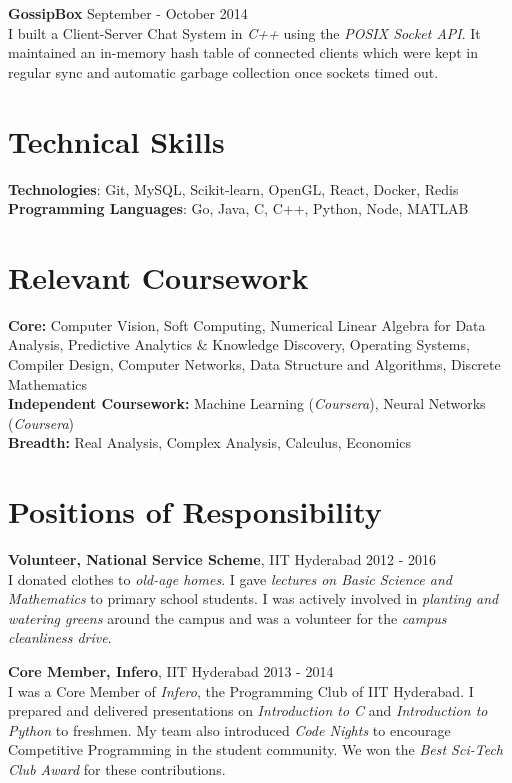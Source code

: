 \documentclass[margin,line]{res}
\begin{document}
\begin{resume}
  \vspace*{-2.5mm}

  {\bf GossipBox} \hfill September - October 2014 \\
    I built a Client-Server Chat System in {\it C++} using the {\it POSIX Socket API}. It maintained an in-memory hash table of connected clients which were kept in regular sync and automatic garbage collection once sockets timed out.

\section{\sc Technical Skills}

  {\bf Technologies}: Git, MySQL, Scikit-learn, OpenGL, React, Docker, Redis \\
  {\bf Programming Languages}: Go, Java, C, C++, Python, Node, MATLAB

\section{\sc Relevant Coursework}

  {\bf Core:} Computer Vision, Soft Computing, Numerical Linear Algebra for Data Analysis, Predictive Analytics \& Knowledge Discovery, Operating Systems, Compiler Design, Computer Networks, Data Structure and Algorithms, Discrete Mathematics \\
  {\bf Independent Coursework:} Machine Learning ({\it Coursera}), Neural Networks ({\it Coursera}) \\
  {\bf Breadth:} Real Analysis, Complex Analysis, Calculus, Economics

\section{\sc Positions of Responsibility}

  {\bf Volunteer, National Service Scheme}, IIT Hyderabad \hfill 2012 - 2016 \\
    I donated clothes to {\it old-age homes}. I gave {\it lectures on Basic Science and Mathematics} to primary school students. I was actively involved in {\it planting and watering greens} around the campus and was a volunteer for the {\it campus cleanliness drive}.

  \vspace*{-2.5mm}

  {\bf Core Member, Infero}, IIT Hyderabad \hfill 2013 - 2014 \\
  	I was a Core Member of {\em Infero}, the Programming Club of IIT Hyderabad. I prepared and delivered presentations on {\em Introduction to C} and {\em Introduction to Python} to freshmen. My team also introduced {\it Code Nights} to encourage Competitive Programming in the student community. We won the {\em Best Sci-Tech Club Award} for these contributions.


\end{resume}
\end{document}
